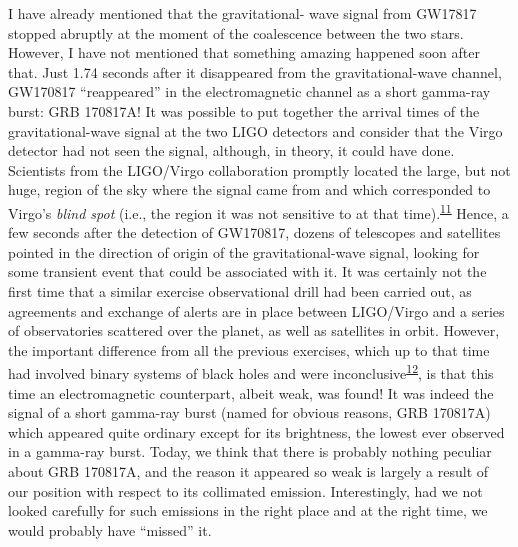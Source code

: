 I have already mentioned that the gravitational- wave signal from GW17817 stopped
abruptly at the moment of the coalescence between the two stars. However, I have not
mentioned that something amazing happened soon after that. Just 1.74 seconds after it
disappeared from the gravitational-wave channel, GW170817
``reappeared'' in the electromagnetic channel as a short gamma-ray burst: GRB
170817A! It was possible to put together the
arrival times of the gravitational-wave signal at the two LIGO detectors and consider
that the Virgo detector had not seen the signal, although, in theory, it could have
done. Scientists from the LIGO/Virgo collaboration promptly located the large, but not
huge, region of the sky where the signal came from and which corresponded to
Virgo's \emph{blind spot} (i.e., the region it was not sensitive to
at that time).\textsuperscript{\hyperlink{note:08-11}{11}} Hence, a few seconds after the detection of GW170817,
dozens of telescopes and satellites pointed in the direction of origin of the
gravitational-wave signal, looking for some transient event that could be associated
with it. It was certainly not the first time that a similar exercise
observational drill had been carried out, as agreements and exchange of alerts are in
place between LIGO/Virgo and a series of observatories scattered over the planet, as
well as satellites in orbit. However, the important difference from all the previous
exercises, which up to that time had involved binary systems of black holes and were
inconclusive\textsuperscript{\hyperlink{note:08-12}{12}}, is that this time an electromagnetic
counterpart, albeit weak, was found! It was indeed the signal of a
short gamma-ray burst (named for obvious reasons, GRB 170817A) which appeared quite
ordinary except for its brightness, the lowest ever observed in a gamma-ray burst.
Today, we think that there is probably nothing peculiar about GRB 170817A, and the
reason it appeared so weak is largely a result of our position with respect to its
collimated emission. Interestingly, had we not looked carefully for such emissions in
the right place and at the right time, we would probably have ``missed'' it.


